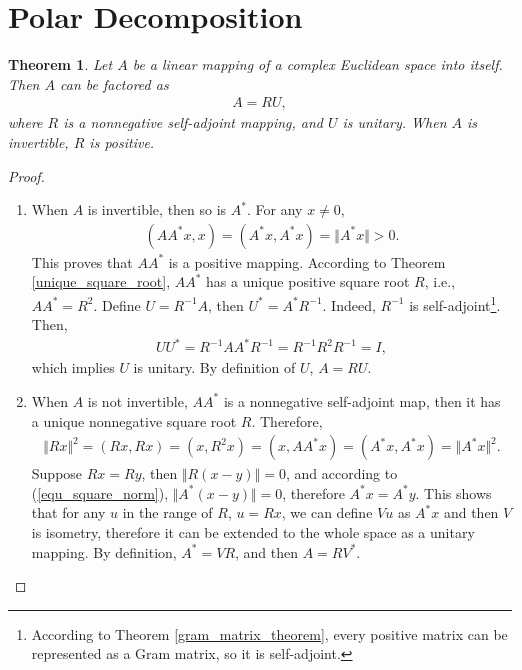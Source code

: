 \documentclass[11pt]{book}
\newtheorem{theorem}{Theorem}[section]
\theoremstyle{definition}
\numberwithin{equation}{chapter}
\begin{document}
\section{Polar Decomposition}
\begin{theorem}\label{polar_decomposition_theorem}
Let $A$ be a linear mapping of a complex Euclidean space into itself. Then $A$ can be factored as 
\begin{align}\label{polar_decomposition}
    A = RU,
\end{align}
where $R$ is a nonnegative self-adjoint mapping, and $U$ is unitary. When $A$ is invertible, $R$ is positive.
\end{theorem}
\begin{proof}
~\begin{enumerate}[label=(\alph*)]
    \item When $A$ is invertible, then so is $A^*$. For any $x \neq 0$,
    \begin{align*}
        (A A^* x, x) = (A^* x, A^* x) = \Vert A^* x \Vert > 0.
    \end{align*}
    This proves that $A A^*$ is a positive mapping. According to Theorem \ref{unique_square_root}, $A A^*$ has a unique positive square root $R$, i.e., $A A^* = R^2$. Define $U = R^{-1}A$, then $U^* = A^* R^{-1}$. Indeed, $R^{-1}$ is self-adjoint\footnote{According to Theorem \ref{gram_matrix_theorem}, every positive matrix can be represented as a Gram matrix, so it is self-adjoint.}. Then,
    \begin{align*}
        U U^* = R^{-1}A A^* R^{-1} = R^{-1} R^2 R^{-1} = I,
    \end{align*}
    which implies $U$ is unitary. By definition of $U$, $A = RU$.
    
    \item When $A$ is not invertible, $AA^*$ is a nonnegative self-adjoint map, then it has a unique nonnegative square root $R$. Therefore, 
    \begin{align}\label{equ_square_norm}
        \Vert R x \Vert^2 = (Rx, Rx) = (x, R^2 x) = (x, AA^*x) = (A^*x, A^*x) = \Vert A^*x \Vert^2.
    \end{align}
    Suppose $Rx = Ry$, then $\Vert R (x - y) \Vert = 0$, and according to (\ref{equ_square_norm}), $\Vert A^* (x - y) \Vert = 0$, therefore $A^* x = A^* y$. This shows that for any $u$ in the range of $R$, $u = Rx$, we can define $Vu$ as 
    $A^* x$ and then $V$ is isometry, therefore it can be extended to the whole space as a unitary mapping. By definition, $A^* = VR$, and then $A = RV^*$.
\end{enumerate}
\end{proof}
\end{document}
